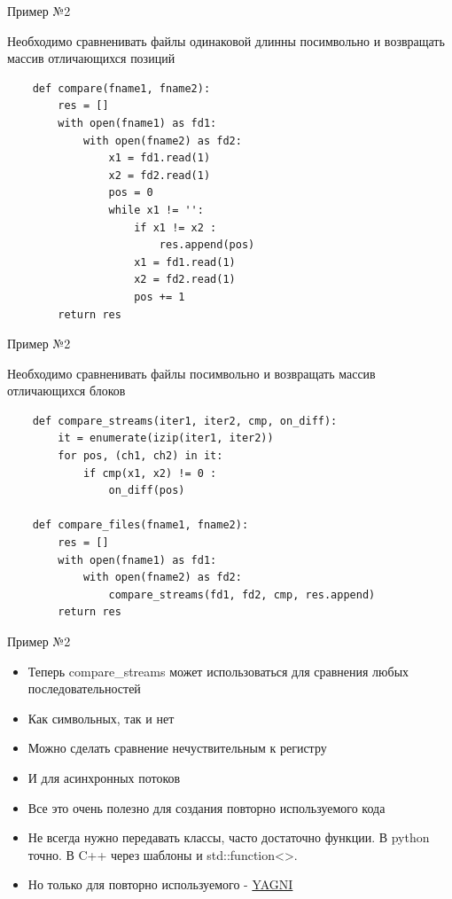 \documentclass{article}
\begin{document}
\begin{center} Пример №2 \end{center}
Необходимо сравненивать файлы одинаковой длинны посимвольно 
    и возвращать массив отличающихся позиций
\begin{lstlisting}
    def compare(fname1, fname2):
        res = []
        with open(fname1) as fd1:
            with open(fname2) as fd2:
                x1 = fd1.read(1)
                x2 = fd2.read(1)
                pos = 0
                while x1 != '':
                    if x1 != x2 :
                        res.append(pos)
                    x1 = fd1.read(1)
                    x2 = fd2.read(1)
                    pos += 1
        return res
\end{lstlisting}
\newpage

\begin{center} Пример №2 \end{center}
Необходимо сравненивать файлы посимвольно и возвращать массив отличающихся блоков
\begin{lstlisting}
    def compare_streams(iter1, iter2, cmp, on_diff):
        it = enumerate(izip(iter1, iter2))
        for pos, (ch1, ch2) in it:
            if cmp(x1, x2) != 0 :
                on_diff(pos)

    def compare_files(fname1, fname2):
        res = []
        with open(fname1) as fd1:
            with open(fname2) as fd2:
                compare_streams(fd1, fd2, cmp, res.append)
        return res
\end{lstlisting}
\newpage

\begin{center} Пример №2 \end{center}
\begin{itemize}
    \item Теперь compare\_streams может использоваться для сравнения любых последовательностей
    \item Как символьных, так и нет
    \item Можно сделать сравнение нечуствительным к регистру
    \item И для асинхронных потоков
    \item Все это очень полезно для создания повторно используемого кода
    \item Не всегда нужно передавать классы, часто достаточно функции. 
            В python точно. В C++ через шаблоны и std::function<>.
    \item Но только для повторно используемого - 
            \href{http://ru.wikipedia.org/wiki/%D0%9F%D1%80%D0%B8%D0%BD%D1%86%D0%B8%D0%BF_YAGNI}{YAGNI}
\end{itemize}
\newpage
\end{document}
